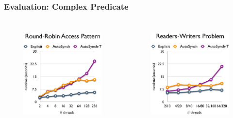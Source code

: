 \documentclass[mathserif,14pt,xcolor=table]{beamer}
\begin{document}
\begin{frame}[t]
    \frametitle{Evaluation: Complex Predicate}
    \begin{columns}
        \begin{figure}[ht!]
            \centering
            \includegraphics[width=56mm]{fig/rr.eps}
            \label{fig:rr_eval}
        \end{figure}
        \begin{figure}[ht!]
            \centering
            \includegraphics[width=56mm]{fig/trw.eps}
            \label{fig:rw_eval}
        \end{figure}
    \end{columns}
\end{frame}
\end{document}
